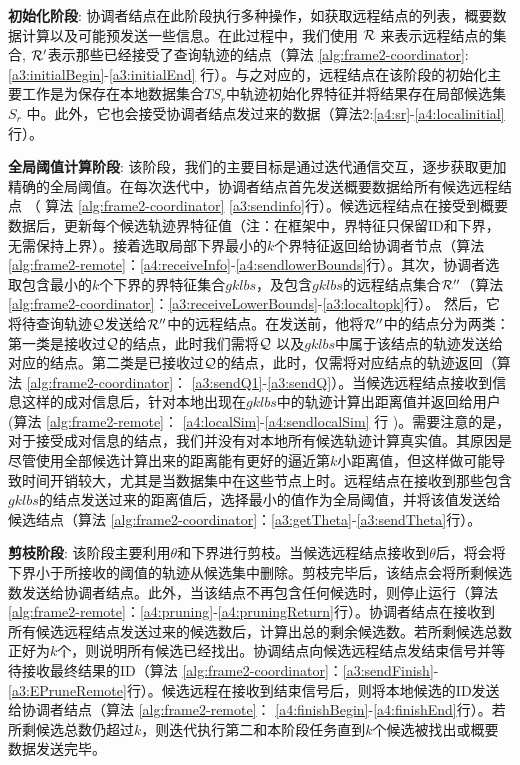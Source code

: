 \textbf{初始化阶段}: 协调者结点在此阶段执行多种操作，如获取远程结点的列表，概要数据计算以及可能预发送一些信息。在此过程中，我们使用
$\cal R$ 来表示远程结点的集合, ${\cal R}'$表示那些已经接受了查询轨迹的结点（算法 \ref{alg:frame2-coordinator}:\ref{a3:initialBegin}-\ref{a3:initialEnd}  行）。与之对应的，远程结点在该阶段的初始化主要工作是为保存在本地数据集合$TS_{r}$中轨迹初始化界特征并将结果存在局部候选集$S_{r}$ 中。此外，它也会接受协调者结点发过来的数据（算法2:\ref{a4:sr}-\ref{a4:localinitial}行）。

\textbf{全局阈值计算阶段}: 该阶段，我们的主要目标是通过迭代通信交互，逐步获取更加精确的全局阈值。在每次迭代中，协调者结点首先发送概要数据给所有候选远程结点
   （ 算法 \ref{alg:frame2-coordinator} \ref{a3:sendinfo}行）。候选远程结点在接受到概要数据后，更新每个候选轨迹界特征值（注：在框架中，界特征只保留ID和下界，无需保持上界）。接着选取局部下界最小的$k$个界特征返回给协调者节点（算法 \ref{alg:frame2-remote}：\ref{a4:receiveInfo}-\ref{a4:sendlowerBounds}行）。其次，协调者选取包含最小的$k$个下界的界特征集合$gklbs$，及包含$gklbs$的远程结点集合${\cal R}''$（算法 \ref{alg:frame2-coordinator}：\ref{a3:receiveLowerBounds}-\ref{a3:localtopk}行）。
   然后，它将待查询轨迹$\cal Q$发送给${\cal R}''$中的远程结点。在发送前，他将${\cal R}''$中的结点分为两类：第一类是接收过$\cal Q$的结点，此时我们需将$\cal Q$ 以及$gklbs$中属于该结点的轨迹发送给对应的结点。第二类是已接收过$\cal Q$的结点，此时，仅需将对应结点的轨迹返回（算法 \ref{alg:frame2-coordinator}：
    \ref{a3:sendQ1}-\ref{a3:sendQ}）。当候选远程结点接收到信息这样的成对信息后，针对本地出现在$gklbs$中的轨迹计算出距离值并返回给用户(算法 \ref{alg:frame2-remote}： \ref{a4:localSim}-\ref{a4:sendlocalSim} 行 )。需要注意的是，对于接受成对信息的结点，我们并没有对本地所有候选轨迹计算真实值。其原因是尽管使用全部候选计算出来的距离能有更好的逼近第$k$小距离值，但这样做可能导致时间开销较大，尤其是当数据集中在这些节点上时。远程结点在接收到那些包含$gklbs$的结点发送过来的距离值后，选择最小的值作为全局阈值，并将该值发送给候选结点（算法 \ref{alg:frame2-coordinator}：\ref{a3:getTheta}-\ref{a3:sendTheta}行）。
    
  
    
\textbf{剪枝阶段}: 该阶段主要利用$\theta$和下界进行剪枝。当候选远程结点接收到$\theta$后，将会将下界小于所接收的阈值的轨迹从候选集中删除。剪枝完毕后，该结点会将所剩候选数发送给协调者结点。此外，当该结点不再包含任何候选时，则停止运行（算法 \ref{alg:frame2-remote}：\ref{a4:pruning}-\ref{a4:pruningReturn}行）。协调者结点在接收到
所有候选远程结点发送过来的候选数后，计算出总的剩余候选数。若所剩候选总数正好为$k$个，则说明所有候选已经找出。协调结点向候选远程结点发结束信号并等待接收最终结果的ID（算法 \ref{alg:frame2-coordinator}：\ref{a3:sendFinish}-\ref{a3:EPruneRemote}行）。候选远程在接收到结束信号后，则将本地候选的ID发送给协调者结点（算法 \ref{alg:frame2-remote}： \ref{a4:finishBegin}-\ref{a4:finishEnd}行）。若所剩候选总数仍超过$k$，则迭代执行第二和本阶段任务直到$k$个候选被找出或概要数据发送完毕。


